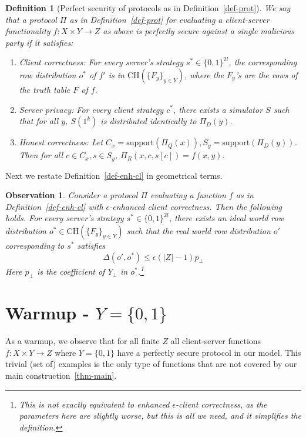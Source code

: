 \documentclass[a4paper]{article}
\newtheorem{definition}{Definition}[section]
\newtheorem{observation}{Observation}
\newcommand{\support}{\mathrm{support}}
\newcommand{\CH}[1]{\text{CH}(#1)}
\begin{document}
\begin{definition}[Perfect security of protocols as in Definition~\ref{def-prot}]\label{perfect-security}
We say that a protocol $\Pi$ as in Definition~\ref{def-prot} for evaluating a client-server functionality $f:X\times Y\rightarrow Z$ as above is perfectly secure against a single malicious party if it satisfies:
\begin{enumerate}
\item Client correctness: For every server's strategy $s^*\in \{0,1\}^{2l}$, the corresponding row distribution $o^*$ of $f'$
is in $\CH{\{F_y\}_{y\in Y}}$, where the $F_y$'s are the rows of the truth table $F$ of $f$.
\item Server privacy: For every client strategy $c^*$, there exists a simulator $S$ such that for all $y$,
$S(1^k)$ is distributed identically to $\Pi_D(y)$. 

\item Honest correctness: Let $C_x=\support(\Pi_Q(x)),S_y=\support(\Pi_D(y))$. Then for all $c\in C_x,s\in S_y$, $\Pi_R(x,c,s[c])=f(x,y)$.
\end{enumerate}
\end{definition}

Next we restate Definition~\ref{def-enh-cl} in geometrical terms.

\begin{observation}\label{obs-geom-enh-cl}
	Consider a protocol $\Pi$ evaluating a function $f$ as in Definition~\ref{def-enh-cl} with $\epsilon$-enhanced client correctness.
	Then the following holds. 
	For every server's strategy $s^*\in \{0,1\}^{2l}$, 
	there exists an ideal world row distribution $o^*\in \CH{\{F_y\}_{y\in Y}}$ such that 
	the real world row distribution $o'$ corresponding to $s^*$
	satisfies 
	\[\Delta(o',o^*)\leq \epsilon(|Z|-1)p_\bot\]
	Here $p_\bot$ is the coefficient of $Y_\bot$ in $o^*$.\footnote{This is not exactly equivalent to enhanced $\epsilon$-client correctness, as the parameters here are slightly worse, but this is all we need, and it simplifies the definition.}
\end{observation} 

\section{Warmup - $Y=\{0,1\}$}

As a warmup, we observe that for all finite $Z$
all client-server functions $f:X\times Y\rightarrow Z$ where $Y=\{0,1\}$
have a perfectly secure protocol in our model. This trivial (set of) examples is the only type of functions that are not covered by our main construction~\ref{thm-main}.
\end{document}

